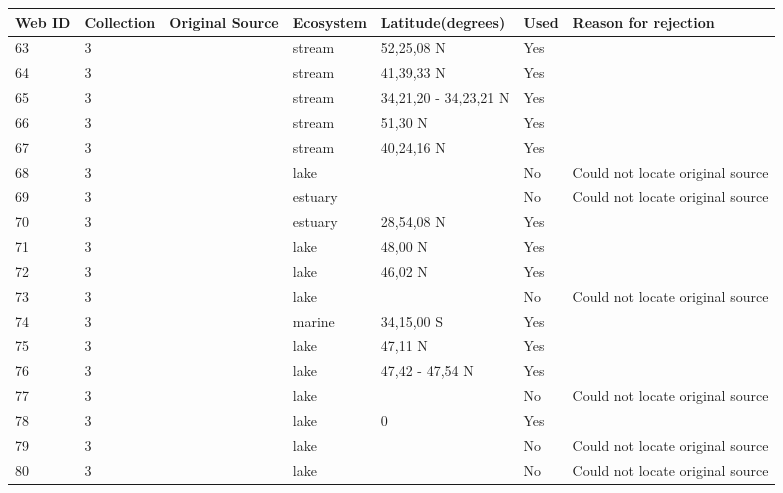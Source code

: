 \documentclass[12pt]{article}
\begin{document}
\begin{landscape}
    \begin{table}[h!]
    \centering
    {\footnotesize
      \begin{tabular}{p{2.8cm}p{1.3cm}p{5.5cm}p{2.2cm}p{2.5cm}lp{3.5cm}}
        \hline
        Web ID & Collection & Original Source & Ecosystem & Latitude(degrees) & Used  & Reason for rejection  \\
        \hline
        63    & 3 & \citet{Jones1950}     & stream & 52,25,08 N & Yes   &       \\
        64    & 3 & \citet{Cummins1966}    & stream & 41,39,33 N & Yes   &       \\
        65    & 3 & \citet{Tsuda1972}  & stream & 34,21,20 - 34,23,21 N & Yes   &       \\
        66    & 3 & \citet{Mann1972a}  & stream & 51,30 N & Yes   &       \\
        67    & 3 & \citet{Carlson1968}    & stream & 40,24,16 N & Yes   &       \\
        68    & 3 & \citet{Morgan1972}  & lake &       & No    & Could not locate original source \\
        69    & 3 & \citet{Cohen1990}  & estuary &       & No    & Could not locate original source \\
        70    & 3 & \citet{Kemp1977}    & estuary & 28,54,08 N & Yes   &       \\
        71    & 3 & \citet{Sorokin1972}  & lake & 48,00 N & Yes   &       \\
        72    & 3 & \citet{Baril1983}  & lake & 46,02 N & Yes   &       \\
        73    & 3 & \citet{Schiemer1979}  & lake &       & No    & Could not locate original source \\
        74    & 3 & \citet{Cohen1990} & marine & 34,15,00 S & Yes   &       \\
        75    & 3 & \citet{Pechlaner1972}  & lake & 47,11 N & Yes   &       \\
        76    & 3 & \citet{Schiemer1979}  & lake & 47,42 - 47,54 N & Yes   &       \\
        77    & 3 & \citet{Cohen1990}  & lake &       & No    & Could not locate original source \\
        78    & 3 & \citet{Burgis1972}  & lake & 0     & Yes   &       \\
        79    & 3 & \citet{Sarvala1974}  & lake &       & No    & Could not locate original source \\
        80    & 3 & \citet{Sarvala1974}  & lake &       & No    & Could not locate original source \\

\end{tabular}}
\end{table}
\end{landscape}
\end{document}
